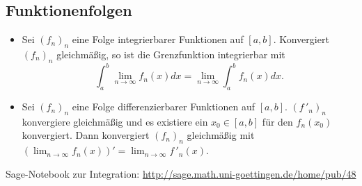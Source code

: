 \documentclass[a4paper,12pt,DIV15]{scrartcl}
\begin{document}
\subsection{Funktionenfolgen}
\begin{itemize}
\item Sei $(f_n)_n$ eine Folge integrierbarer Funktionen auf
$[a,b]$. Konvergiert $(f_n)_n$ gleichmäßig, so ist die Grenzfunktion
integrierbar mit
\[ \int_a^b \lim_{n \rightarrow \infty} f_n(x) dx = \lim_{n
\rightarrow \infty} \int_a^b f_n(x) dx .\]
\item Sei $(f_n)_n$ eine Folge differenzierbarer Funktionen auf
$[a,b]$. $(f\,'_n)_n$ konvergiere gleichmäßig und es existiere ein $x_0
\in [a,b]$ für den $f_n(x_0)$ konvergiert. Dann konvergiert $(f_n)_n$
gleichmäßig mit $( \lim_{n \rightarrow \infty} f_n(x))' = \lim_{n
\rightarrow \infty} f\,'_n(x)$.  
\end{itemize}
 
\begin{center}
    Sage-Notebook zur Integration:
     \url{http://sage.math.uni-goettingen.de/home/pub/48}
 \end{center}
\end{document}
